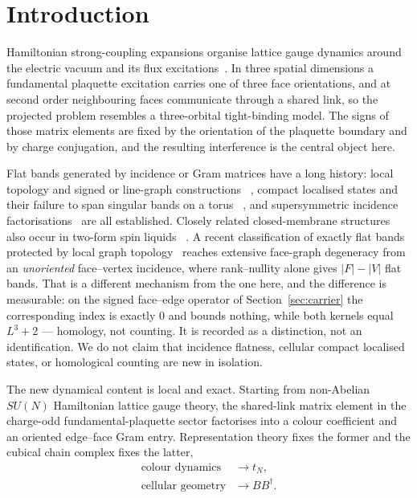 \documentclass[11pt]{article}
\theoremstyle{plain}
\theoremstyle{definition}
\theoremstyle{remark}
\newcommand{\chk}[1]{}
\newcommand{\dg}{^{\dagger}}
\begin{document}
\section{Introduction}

Hamiltonian strong-coupling expansions organise lattice gauge dynamics around
the electric vacuum and its flux excitations~\cite{KS1975,KSS1976}. In three
spatial dimensions a fundamental plaquette excitation carries one of three face
orientations, and at second order neighbouring faces communicate through a
shared link, so the projected problem resembles a three-orbital tight-binding
model. The signs of those matrix elements are fixed by the orientation of the
plaquette boundary and by charge conjugation, and the resulting interference is
the central object here.

Flat bands generated by incidence or Gram matrices have a long history: local
topology and signed or line-graph constructions
~\cite{Eckmann1944,Sutherland1986,Mielke1991,Zaslavsky2010,Kollar2020},
compact localised states and their failure to span singular bands on a torus
~\cite{Bergman2008,RhimYang2019}, and supersymmetric incidence
factorisations~\cite{Roychowdhury2024} are all established. Closely related
closed-membrane structures also occur in two-form spin liquids
~\cite{ChungGingras2025}. A recent
classification of exactly flat bands protected by local graph
topology~\cite{Hazra2026} reaches extensive face-graph degeneracy from an
\emph{unoriented} face--vertex incidence, where rank--nullity alone gives
$|F|-|V|$ flat bands. That is a different mechanism from the one here, and the
difference is measurable: on the signed face--edge operator of
Section~\ref{sec:carrier} the corresponding index is exactly $0$ and bounds
nothing, while both kernels equal $L^3+2$ --- homology, not counting. It is
recorded as a distinction, not an identification. We do not claim that
incidence flatness, cellular compact localised states, or homological counting
are new in isolation.
\chk{the discrete index theorem gives 0 on the signed face-edge operator, bounding nothing}

The new dynamical content is local and exact. Starting from non-Abelian
$SU(N)$ Hamiltonian lattice gauge theory, the shared-link matrix element in the
charge-odd fundamental-plaquette sector factorises into a colour coefficient
and an oriented edge--face Gram entry. Representation theory fixes the former
and the cubical chain complex fixes the latter,
\[
  \begin{aligned}
    \text{colour dynamics}&\longrightarrow t_N,\\
    \text{cellular geometry}&\longrightarrow BB\dg .
  \end{aligned}
\]
\end{document}
